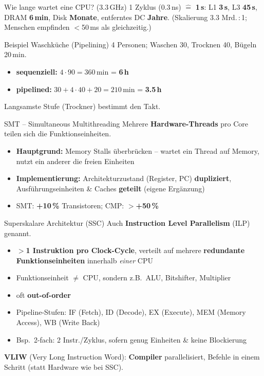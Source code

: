 \documentclass[a4paper, fontsize=7pt]{scrartcl}
\begin{document}
\begin{subbox}{Wie lange wartet eine CPU? (3.3\,GHz)}
1 Zyklus (0.3\,ns) $\widehat{=}$ \textbf{1\,s}: L1 \textbf{3\,s}, L3
\textbf{45\,s}, DRAM \textbf{6\,min}, Disk \textbf{Monate}, entferntes DC
\textbf{Jahre}. (Skalierung 3.3 Mrd.\,:\,1; Menschen empfinden $<$50\,ms als
gleichzeitig.)
\end{subbox}

\begin{subbox}{Beispiel Waschküche (Pipelining)}
4 Personen; Waschen 30, Trocknen 40, Bügeln 20\,min.
\begin{itemize}
    \item \textbf{sequenziell:} $4 \cdot 90 = 360$\,min = \textbf{6\,h}
    \item \textbf{pipelined:} $30 + 4 \cdot 40 + 20 = 210$\,min =
          \textbf{3.5\,h}
\end{itemize}
Langsamste Stufe (Trockner) bestimmt den Takt.
\end{subbox}

\begin{mainbox}{SMT -- Simultaneous Multithreading}
Mehrere \textbf{Hardware-Threads} pro Core teilen sich die Funktionseinheiten.
\begin{itemize}
    \item \textbf{Hauptgrund:} Memory Stalls überbrücken -- wartet ein Thread
          auf Memory, nutzt ein anderer die freien Einheiten
    \item \textbf{Implementierung:} Architekturzustand (Register, PC)
          \textbf{dupliziert}, Ausführungseinheiten \& Caches \textbf{geteilt}
          (eigene Ergänzung)
    \item SMT: \textbf{+10\,\%} Transistoren; CMP: \textbf{$>$+50\,\%}
\end{itemize}
\end{mainbox}

\begin{mainbox}{Superskalare Architektur (SSC)}
Auch \textbf{Instruction Level Parallelism} (ILP) genannt.
\begin{itemize}
    \item \textbf{$>$1 Instruktion pro Clock-Cycle}, verteilt auf mehrere
          \textbf{redundante Funktionseinheiten} innerhalb \emph{einer} CPU
    \item Funktionseinheit $\neq$ CPU, sondern z.B.\ ALU, Bitshifter,
          Multiplier
    \item oft \textbf{out-of-order}
    \item Pipeline-Stufen: IF (Fetch), ID (Decode), EX (Execute), MEM (Memory
          Access), WB (Write Back)
    \item Bsp.\ 2-fach: 2 Instr./Zyklus, sofern genug Einheiten \& keine
          Blockierung
\end{itemize}
\textbf{VLIW} (Very Long Instruction Word): \textbf{Compiler} parallelisiert,
Befehle in einem Schritt (statt Hardware wie bei SSC).
\end{mainbox}
\end{document}
